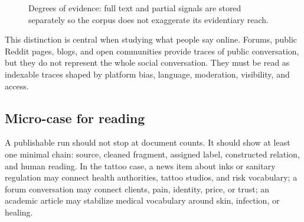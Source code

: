 \documentclass[11pt]{article}
\begin{document}
\begin{figure}[H]
\centering
{}
\caption{Degrees of evidence: full text and partial signals are stored separately so the corpus does not exaggerate its evidentiary reach.}
\label{fig:rights-evidence-en}
\end{figure}

This distinction is central when studying what people say online. Forums,
public Reddit pages, blogs, and open communities provide traces of public
conversation, but they do not represent the whole social conversation. They
must be read as indexable traces shaped by platform bias, language, moderation,
visibility, and access.

\subsection*{Micro-case for reading}

A publishable run should not stop at document counts. It should show at least
one minimal chain: source, cleaned fragment, assigned label, constructed
relation, and human reading. In the tattoo case, a news item about inks or
sanitary regulation may connect health authorities, tattoo studios, and risk
vocabulary; a forum conversation may connect clients, pain, identity, price, or
trust; an academic article may stabilize medical vocabulary around skin,
infection, or healing.
\end{document}
